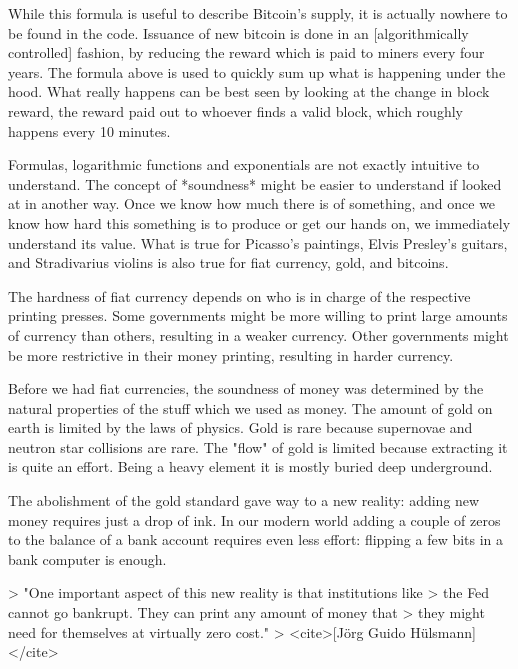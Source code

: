 {%

While this formula is useful to describe Bitcoin's supply, it is
actually nowhere to be found in the code. Issuance of new bitcoin is
done in an [algorithmically controlled] fashion, by reducing the reward
which is paid to miners every four years. The formula above is used to
quickly sum up what is happening under the hood. What really happens can
be best seen by looking at the change in block reward, the reward paid
out to whoever finds a valid block, which roughly happens every 10
minutes.

{%

Formulas, logarithmic functions and exponentials are not exactly
intuitive to understand. The concept of *soundness* might be easier to
understand if looked at in another way. Once we know how much there is
of something, and once we know how hard this something is to produce or
get our hands on, we immediately understand its value. What is true for
Picasso's paintings, Elvis Presley's guitars, and Stradivarius violins
is also true for fiat currency, gold, and bitcoins.

The hardness of fiat currency depends on who is in charge of the
respective printing presses. Some governments might be more willing to
print large amounts of currency than others, resulting in a weaker
currency. Other governments might be more restrictive in their money
printing, resulting in harder currency.

Before we had fiat currencies, the soundness of money was determined by
the natural properties of the stuff which we used as money. The amount
of gold on earth is limited by the laws of physics. Gold is rare because
supernovae and neutron star collisions are rare. The "flow" of gold is
limited because extracting it is quite an effort. Being a heavy element
it is mostly buried deep underground.

The abolishment of the gold standard gave way to a new reality: adding
new money requires just a drop of ink. In our modern world adding a
couple of zeros to the balance of a bank account requires even less
effort: flipping a few bits in a bank computer is enough.

> "One important aspect of this new reality is that institutions like
> the Fed cannot go bankrupt. They can print any amount of money that
> they might need for themselves at virtually zero cost."
> <cite>[Jörg Guido Hülsmann]</cite>

}}
